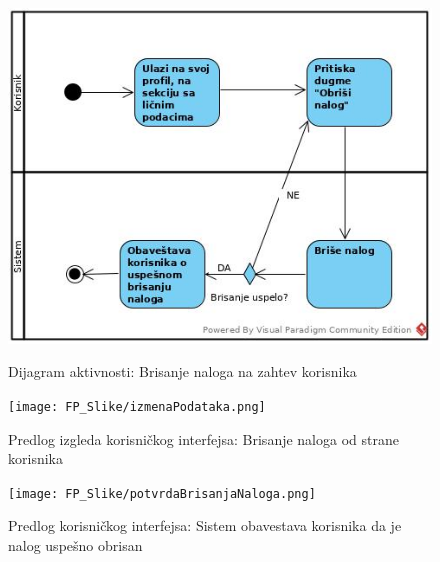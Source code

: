 \documentclass[20pt]{article}
\begin{document}
\begin{figure}[h]
        \centering
        \includegraphics[width=1.1\textwidth,height=0.57\textheight]{Pictures/BrisanjeNalogaNaZahtevKorisnika.jpg}\\
        \caption{Dijagram aktivnosti: Brisanje naloga na zahtev korisnika}
        \label{fig:dijagramAktivnostiBrisanjeKorisnik}
    \end{figure}
    

\newpage
\begin{figure}[h]
        \centering
        \texttt{[image: FP\_Slike/izmenaPodataka.png]}\\
        \caption{Predlog izgleda korisni\v ckog interfejsa: Brisanje naloga od strane korisnika}
    \end{figure}
    
\newpage
\begin{figure}[h]
        \centering
        \texttt{[image: FP\_Slike/potvrdaBrisanjaNaloga.png]}\\
        \caption{Predlog korisni\v ckog interfejsa: Sistem obavestava korisnika da je nalog uspe\v sno obrisan}
    \end{figure}
    

\newpage
\end{document}
